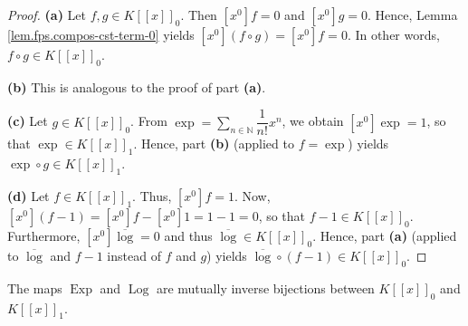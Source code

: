 \begin{proof}
\textbf{(a)} Let $f,g\in
K\left[\left[x\right]\right]_{0}$. Then $\left[
x^{0}\right]f=0$ and $\left[x^{0}\right]g=0$. Hence, Lemma
\ref{lem.fps.compos-cst-term-0} yields $\left[x^{0}\right]\left(f\circ
g\right)=\left[x^{0}\right]f=0$. In other words, $f\circ g\in K\left[
\left[x\right]\right]_{0}$.

\textbf{(b)} This is analogous to the proof of part \textbf{(a)}.

\textbf{(c)} Let $g\in K\left[\left[x\right]\right]_{0}$. From
$\exp=\sum_{n\in\mathbb{N}}\dfrac{1}{n!}x^{n}$, we obtain $\left[
x^{0}\right]\exp=1$, so that $\exp\in K\left[\left[
x\right]\right]_{1}$. Hence, part
\textbf{(b)} (applied to $f=\exp$) yields $\exp\circ g\in K\left[\left[
x\right]\right]_{1}$.

\textbf{(d)} Let $f\in K\left[\left[x\right]\right]_{1}$. Thus,
$\left[x^{0}\right]f=1$. Now,
$\left[x^{0}\right]\left(f-1\right)=\left[x^{0}\right]
f-\left[x^{0}\right]1=1-1=0$, so that $f-1\in
K\left[\left[x\right]\right]_{0}$. Furthermore, $\left[x^{0}\right]
\overline{\log}=0$ and thus $\overline{\log}\in K\left[\left[
x\right]\right]_{0}$. Hence, part
\textbf{(a)} (applied to $\overline{\log}$ and $f-1$ instead of $f$ and $g$)
yields $\overline{\log}\circ\left(f-1\right)\in K\left[\left[x\right]
\right]_{0}$.
\end{proof}

\begin{lemma}
\label{lem.fps.Exp-Log-maps-inv}
\leantarget
\leanok
The maps $\operatorname{Exp}$ and
$\operatorname{Log}$ are mutually inverse bijections between $K\left[
\left[x\right]\right]_{0}$ and $K\left[\left[x\right]\right]_{1}$.
\end{lemma}

